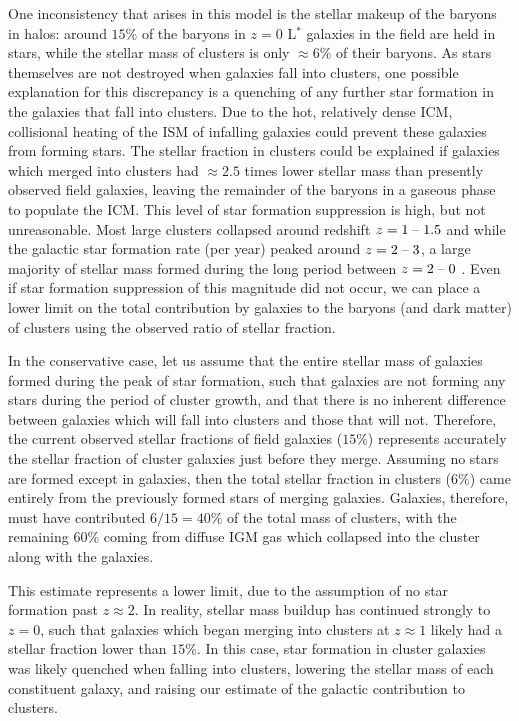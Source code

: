 One inconsistency that arises in this model is the stellar makeup of
the baryons in halos: around $15\%$ of the baryons in $z=0$ L$^*$
galaxies in the field are held in stars, while the stellar mass of
clusters is only $\approx6\%$ of their baryons. As stars themselves
are not destroyed when galaxies fall into clusters, one possible
explanation for this discrepancy is a quenching of any further star
formation in the galaxies that fall into clusters. Due to the hot,
relatively dense ICM, collisional heating of the ISM of infalling
galaxies could prevent these galaxies from forming stars. The stellar
fraction in clusters could be explained if galaxies which merged into
clusters had $\approx 2.5$ times lower stellar mass than presently
observed field galaxies, leaving the remainder of the baryons in a
gaseous phase to populate the ICM. This level of star formation
suppression is high, but not unreasonable. Most large clusters
collapsed around redshift $z=1\;\textrm{--}\;1.5$ \citep{Eke1996, Battaglia2013} and
while the galactic star formation rate (per year) peaked around
$z=2\;\textrm{--}\;3$, a large majority of stellar mass formed during the long
period between $z=2\;\textrm{--}\;0$ \citep{Hopkins2006}. Even if star formation
suppression of this magnitude did not occur, we can place a lower
limit on the total contribution by galaxies to the baryons (and dark
matter) of clusters using the observed ratio of stellar fraction.

In the conservative case, let us assume that the entire stellar mass
of galaxies formed during the peak of star formation, such that
galaxies are not forming any stars during the period of cluster
growth, and that there is no inherent difference between galaxies
which will fall into clusters and those that will not. Therefore, the
current observed stellar fractions of field galaxies ($15\%$)
represents accurately the stellar fraction of cluster galaxies just
before they merge. Assuming no stars are formed except in galaxies,
then the total stellar fraction in clusters ($6\%$) came entirely from
the previously formed stars of merging galaxies. Galaxies, therefore,
must have contributed $6/15 = 40\%$ of the total mass of clusters,
with the remaining $60\%$ coming from diffuse IGM gas which collapsed
into the cluster along with the galaxies. 

This estimate represents a lower limit, due to the assumption of no
star formation past $z\approx2$. In reality, stellar mass buildup has
continued strongly to $z=0$, such that galaxies which began merging
into clusters at $z\approx1$ likely had a stellar fraction lower than
$15\%$. In this case, star formation in cluster galaxies was likely
quenched when falling into clusters, lowering the stellar mass of each
constituent galaxy, and raising our estimate of the galactic
contribution to clusters.

